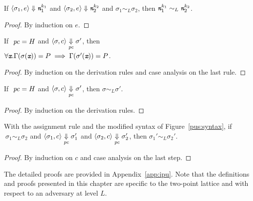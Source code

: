 \begin{myLemma}
\label{lem:expeval}
If $\langle \sigma_1, e \rangle \Downarrow \emph{\texttt{n}}_1^{k_1}$ and $\langle 
\sigma_2, e \rangle \Downarrow \emph{\texttt{n}}_2^{k_2}$ and $\sigma_1 \sim_L
\sigma_2$, then $\emph{\texttt{n}}_1^{k_1} \sim_L \emph{\texttt{n}}_2^{k_2}$.
\end{myLemma}
\begin{proof} By induction on $e$.
\end{proof}

\begin{myLemma}[Evolution]
\label{lem:evol}
  If $~\mathit{pc} = H$ and $\langle \sigma, c \rangle \underset{\mathit{pc}}{\Downarrow} \sigma'$, then
  \\ $\forall \emph{\texttt{x}}.\Gamma(\sigma(\emph{\texttt{x}})) = P
  \implies \Gamma(\sigma'(\emph{\texttt{x}})) = P$. 
\end{myLemma}
\begin{proof} By induction on the derivation rules and case
  analysis on the last rule.
\end{proof}

\begin{myLemma}
\label{lem:conf}
  If $~\mathit{pc} = H$ and $\langle \sigma, c \rangle
  \underset{\mathit{pc}}{\Downarrow} \sigma' $, then $\sigma \sim_L \sigma'$.
\end{myLemma}
\begin{proof} By induction on the derivation rules.
\end{proof}

\begin{myThm}
  With the assignment rule  and the modified syntax of
  Figure~\ref{pus:syntax}, if 
  $~\sigma_1 \sim_L \sigma_2$ and $\langle \sigma_1, c \rangle
  \underset{\mathit{pc}}{\Downarrow} \sigma_1' $ and $\langle \sigma_2, c
  \rangle\underset{\mathit{pc}}{\Downarrow} \sigma_2' $, then $\sigma_1' \sim_L
  \sigma_2'$.
\end{myThm}
\begin{proof} By induction on $c$ and case
  analysis on the last step.
\end{proof}

The detailed proofs are provided in Appendix~\ref{app:ipu}. 
Note that the definitions and proofs presented in this chapter are
specific to the two-point lattice and with respect to an adversary at
level $L$. 

